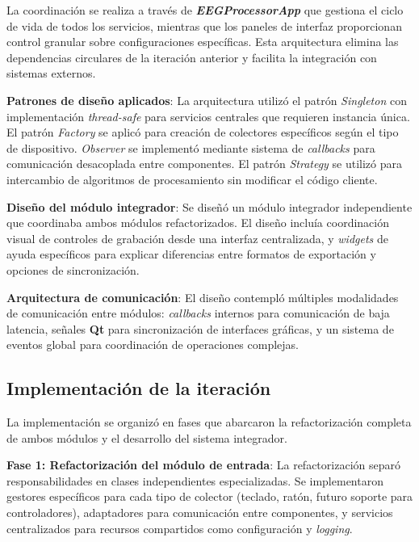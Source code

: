 La coordinación se realiza a través de \textit{\textbf{EEGProcessorApp}} que gestiona el ciclo de vida de todos los servicios, mientras que los paneles de interfaz proporcionan control granular sobre configuraciones específicas. Esta arquitectura elimina las dependencias circulares de la iteración anterior y facilita la integración con sistemas externos.

\textbf{Patrones de diseño aplicados}:
La arquitectura utilizó el patrón \textit{Singleton} con implementación \textit{\gls{thread-safe}} para servicios centrales que requieren instancia única. El patrón \textit{Factory} se aplicó para creación de colectores específicos según el tipo de dispositivo. \textit{Observer} se implementó mediante sistema de \textit{\glspl{callback}} para comunicación desacoplada entre componentes. El patrón \textit{Strategy} se utilizó para intercambio de algoritmos de procesamiento sin modificar el código cliente.

\textbf{Diseño del módulo integrador}:
Se diseñó un módulo integrador independiente que coordinaba ambos módulos refactorizados. El diseño incluía coordinación visual de controles de grabación desde una interfaz centralizada, y \textit{\glspl{widget}} de ayuda específicos para explicar diferencias entre formatos de exportación y opciones de sincronización.

\textbf{Arquitectura de comunicación}:
El diseño contempló múltiples modalidades de comunicación entre módulos: \textit{\glspl{callback}} internos para comunicación de baja latencia, señales \textbf{Qt} para sincronización de interfaces gráficas, y un sistema de eventos global para coordinación de operaciones complejas.

\subsection{Implementación de la iteración}
\label{subsec:implementacion_iteracion_2}

La implementación se organizó en fases que abarcaron la refactorización completa de ambos módulos y el desarrollo del sistema integrador.

\textbf{Fase 1: Refactorización del módulo de entrada}:
La refactorización separó responsabilidades en clases independientes especializadas. Se implementaron gestores específicos para cada tipo de colector (teclado, ratón, futuro soporte para controladores), adaptadores para comunicación entre componentes, y servicios centralizados para recursos compartidos como configuración y \textit{logging}.

